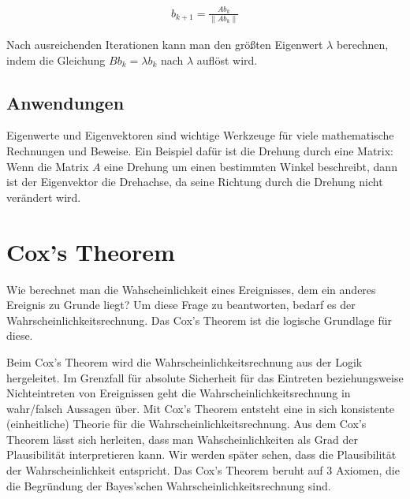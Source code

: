 \documentclass[]{dsadokumentation}
\begin{document}
\begin{equation}
  \begin{aligned}
    b_{k+1} = \frac{Ab_k}{\left\lVert Ab_k \right\rVert }
  \end{aligned}
\end{equation}

Nach ausreichenden Iterationen kann man den größten Eigenwert $\lambda$ berechnen, indem die Gleichung $B b_{k} = \lambda b_{k}$ nach $\lambda$ auflöst wird. 


\subsection{Anwendungen}

Eigenwerte und Eigenvektoren sind wichtige Werkzeuge für viele mathematische Rechnungen und Beweise. Ein Beispiel dafür ist die Drehung durch eine Matrix: Wenn die Matrix $A$ eine Drehung um einen bestimmten Winkel beschreibt, dann ist der Eigenvektor die Drehachse, da seine Richtung durch die Drehung nicht verändert wird. 

\section{Cox's Theorem}
Wie berechnet man die Wahscheinlichkeit eines Ereignisses, dem ein anderes Ereignis zu Grunde liegt? Um diese Frage zu beantworten, bedarf es der Wahrscheinlichkeitsrechnung. Das Cox's Theorem ist die logische Grundlage für diese.


Beim Cox's Theorem wird die Wahrscheinlichkeitsrechnung aus  der Logik hergeleitet. Im Grenzfall für absolute Sicherheit für das Eintreten beziehungsweise Nichteintreten von Ereignissen geht die Wahrscheinlichkeitsrechnung in wahr/falsch Aussagen über. Mit Cox's Theorem entsteht eine in sich konsistente (einheitliche) Theorie für die Wahrscheinlichkeitsrechnung.
Aus dem Cox's Theorem lässt sich herleiten, dass man Wahscheinlichkeiten als Grad der Plausibilität interpretieren kann. Wir werden später sehen, dass die Plausibilität der Wahrscheinlichkeit entspricht.
Das Cox's Theorem beruht auf 3 Axiomen, die die Begründung der Bayes'schen Wahrscheinlichkeitsrechnung sind.
\end{document}
